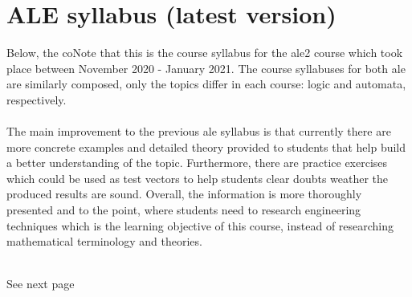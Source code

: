 \chapter{ALE syllabus (latest version)}\label{appendices:syllabus}

Below, the coNote that this is the course syllabus for the \acrshort{ale}2 course which took place between November 2020 - January 2021. 
The course syllabuses for both \acrshort{ale} are similarly composed, only the topics differ in each course: logic and automata, respectively.
\\\\
The main improvement to the previous \acrshort{ale} syllabus is that currently there are more concrete examples and detailed theory provided to students that help build a better understanding of the topic. Furthermore, there are practice exercises which could be used as test vectors to help students clear doubts weather the produced results are sound. Overall, the information is more thoroughly presented and to the point, where students need to research engineering techniques which is the learning objective of this course, instead of researching mathematical terminology and theories.
\\\\
\begin{minipage}{0.5\textwidth}
\begin{flushleft}
\end{flushleft}
\end{minipage}
\hfill
\begin{minipage}{0.5\textwidth}
\begin{flushright}
   See next page
\end{flushright}
\end{minipage}


